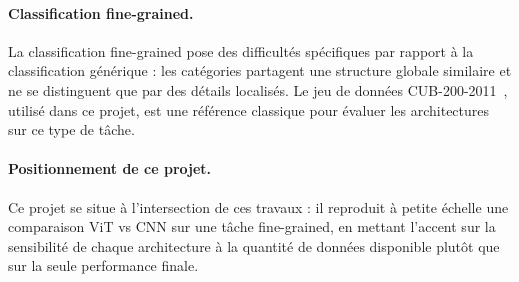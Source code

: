 \paragraph{Classification fine-grained.}
La classification fine-grained pose des difficultés spécifiques par
rapport à la classification générique : les catégories partagent une
structure globale similaire et ne se distinguent que par des détails
localisés. Le jeu de données CUB-200-2011~\cite{wah2011cub}, utilisé dans
ce projet, est une référence classique pour évaluer les architectures sur
ce type de tâche.

\paragraph{Positionnement de ce projet.}
Ce projet se situe à l'intersection de ces travaux : il reproduit à petite
échelle une comparaison ViT vs CNN sur une tâche fine-grained, en mettant
l'accent sur la sensibilité de chaque architecture à la quantité de
données disponible plutôt que sur la seule performance finale.